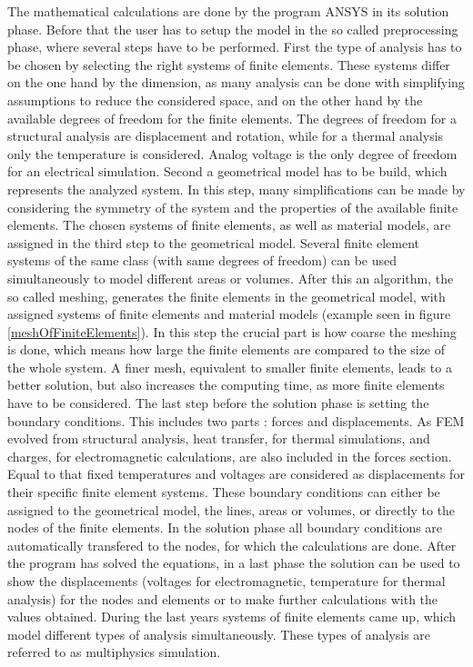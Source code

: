 \documentclass[
a4paper,                                %
twoside,                                %
BCOR1.4cm,                      %
10pt,                           %
headings=normal,                %
headsepline,                    %
clearplainpage, %
final,                                  %
div=14,
parskip=full,
openright,
bibliography=toc
]{scrreprt}
\begin{document}
The mathematical calculations are done by the program ANSYS in its solution phase. Before that the user has to setup the model in the so called preprocessing phase, where several steps have to be performed. First the type of analysis has to be chosen by selecting the right systems of finite elements. These systems differ on the one hand by the dimension, as many analysis can be done with simplifying assumptions to reduce the considered space, and on the other hand by the available degrees of freedom for the finite elements. The degrees of freedom for a structural analysis are displacement and rotation, while for a thermal analysis only the temperature is considered. Analog voltage is the only degree of freedom for an electrical simulation. Second a geometrical model has to be build, which represents the analyzed system. In this step, many simplifications can be made by considering the symmetry of the system and the properties of the available finite elements. The chosen systems of finite elements, as well as material models, are assigned in the third step to the geometrical model. Several finite element systems of the same class (with same degrees of freedom) can be used simultaneously to model different areas or volumes. After this an algorithm, the so called meshing, generates the finite elements in the geometrical model, with assigned systems of finite elements and material models (example seen in figure \ref{meshOfFiniteElements}). In this step the crucial part is how coarse the meshing is done, which means how large the finite elements are compared to the size of the whole system. A finer mesh, equivalent to smaller finite elements, leads to a better solution, but also increases the computing time, as more finite elements have to be considered. The last step before the solution phase is setting the boundary conditions. This includes two parts : forces and displacements. As FEM evolved from structural analysis, heat transfer, for thermal simulations, and charges, for electromagnetic calculations, are also included in the forces section. Equal to that fixed temperatures and voltages are considered as displacements for their specific finite element systems. These boundary conditions can either be assigned to the geometrical model, the lines, areas or volumes, or directly to the nodes of the finite elements. In the solution phase all boundary conditions are automatically transfered to the nodes, for which the calculations are done. After the program has solved the equations, in a last phase the solution can be used to show the displacements (voltages for electromagnetic, temperature for thermal analysis) for the nodes and elements or to make further calculations with the values obtained. During the last years systems of finite elements came up, which model different types of analysis simultaneously. These types of analysis are referred to as multiphysics simulation. \cite{ansysBook}
\end{document}
